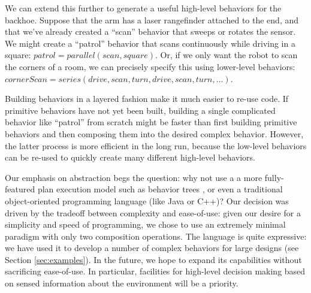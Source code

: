 \documentclass[graybox]{svmult}
\begin{document}
We can extend this further to generate a useful high-level behaviors for the
backhoe.  Suppose that the arm has a laser rangefinder attached to the end,
and that we've already created a ``scan'' behavior that sweeps or rotates the
sensor.  We might create a ``patrol'' behavior that scans continuously while
driving in a square: \(patrol = parallel( scan, square)\). Or, if we only want
the robot to scan the corners of a room, we can precisely specify this using
lower-level behaviors:  \(cornerScan=series(drive, scan, turn, drive,scan,
turn, \ldots) \).

Building behaviors in a layered fashion make it much easier
to re-use code.
If primitive behaviors have not yet been built, building a single complicated behavior like ``patrol'' from scratch might  be faster
than first building primitive behaviors and then composing them into the desired
complex behavior. However, the latter process is more efficient in the long run,
because the low-level behaviors can be re-used to quickly create many different
high-level behaviors.

Our emphasis on abstraction begs the question: why not use  a a more fully-featured
plan execution model such as behavior trees \cite{marzinotto2014towards}, or even a
traditional object-oriented programming language (like Java or C++)?  Our
decision was driven by the tradeoff between complexity and ease-of-use: given
our desire for a simplicity and speed of programming, we chose to use an
extremely minimal  paradigm with only two composition operations.
The language is quite expressive: we have used it to develop a number of  complex behaviors
for large designs (see Section \ref{sec:examples}). In the future, we hope to expand
its capabilities without sacrificing ease-of-use.  In particular, facilities
for high-level decision making based on sensed information about the environment
will be a priority.
\end{document}
